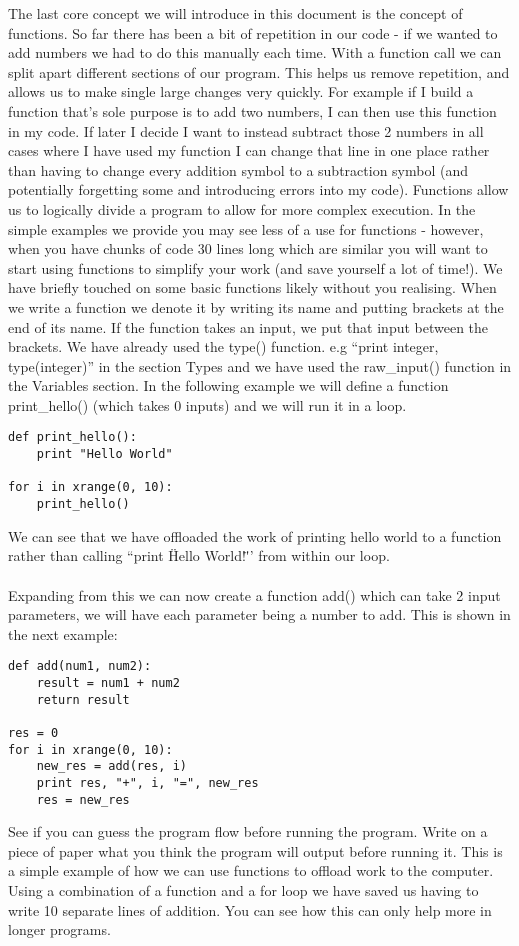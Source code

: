 \documentclass[twocolumn]{article}
\begin{document}
The last core concept we will introduce in this document is the concept of functions. So far there has been a bit of repetition in our code - if we wanted to add numbers we had to do this manually each time. With a function call we can split apart different sections of our program. This helps us remove repetition, and allows us to make single large changes very quickly. For example if I build a function that's sole purpose is to add two numbers, I can then use this function in my code. If later I decide I want to instead subtract those 2 numbers in all cases where I have used my function I can change that line in one place rather than having to change every addition symbol to a subtraction symbol (and potentially forgetting some and introducing errors into my code). Functions allow us to logically divide a program to allow for more complex execution. In the simple examples we provide you may see less of a use for functions - however, when you have chunks of code 30 lines long which are similar you will want to start using functions to simplify your work (and save yourself a lot of time!). We have briefly touched on some basic functions likely without you realising. When we write a function we denote it by writing its name and putting brackets at the end of its name. If the function takes an input, we put that input between the brackets. We have already used the type() function. e.g ``print integer, type(integer)'' in the section Types and we have used the raw\_input() function in the Variables section. In the following example we will define a function print\_hello() (which takes 0 inputs) and we will run it in a loop.
\begin{lstlisting}
def print_hello():
	print "Hello World"

for i in xrange(0, 10):
	print_hello()
\end{lstlisting}
We can see that we have offloaded the work of printing hello world to a function rather than calling ``print \"Hello World!\"'' from within our loop.\\
\\
Expanding from this we can now create a function add() which can take 2 input parameters, we will have each parameter being a number to add. This is shown in the next example:
\begin{lstlisting}
def add(num1, num2):
	result = num1 + num2
	return result

res = 0
for i in xrange(0, 10):
	new_res = add(res, i)
	print res, "+", i, "=", new_res
	res = new_res
\end{lstlisting}
See if you can guess the program flow before running the program. Write on a piece of paper what you think the program will output before running it. This is a simple example of how we can use functions to offload work to the computer. Using a combination of a function and a for loop we have saved us having to write 10 separate lines of addition. You can see how this can only help more in longer programs.
\end{document}
